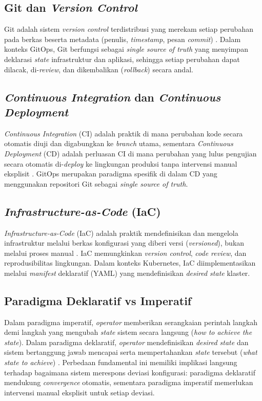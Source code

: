 \subsection{Git dan \textit{Version Control}}
Git adalah sistem \textit{version control} terdistribusi yang merekam setiap perubahan pada berkas beserta metadata (penulis, \textit{timestamp}, pesan \textit{commit}) \citep{chacon2014git}. Dalam konteks GitOps, Git berfungsi sebagai \textit{single source of truth} yang menyimpan deklarasi \textit{state} infrastruktur dan aplikasi, sehingga setiap perubahan dapat dilacak, di-\textit{review}, dan dikembalikan (\textit{rollback}) secara andal.

\subsection{\textit{Continuous Integration} dan \textit{Continuous Deployment}}
\textit{Continuous Integration} (CI) adalah praktik di mana perubahan kode secara otomatis diuji dan digabungkan ke \textit{branch} utama, sementara \textit{Continuous Deployment} (CD) adalah perluasan CI di mana perubahan yang lulus pengujian secara otomatis di-\textit{deploy} ke lingkungan produksi tanpa intervensi manual eksplisit \citep{humble2010continuous, ebert2016devops}. GitOps merupakan paradigma spesifik di dalam CD yang menggunakan repositori Git sebagai \textit{single source of truth}.

\subsection{\textit{Infrastructure-as-Code} (IaC)}
\textit{Infrastructure-as-Code} (IaC) adalah praktik mendefinisikan dan mengelola infrastruktur melalui berkas konfigurasi yang diberi versi (\textit{versioned}), bukan melalui proses manual \citep{morris2020iac}. IaC memungkinkan \textit{version control}, \textit{code review}, dan reprodusibilitas lingkungan. Dalam konteks Kubernetes, IaC diimplementasikan melalui \textit{manifest} deklaratif (YAML) yang mendefinisikan \textit{desired state} klaster.

\subsection{Paradigma Deklaratif vs Imperatif}
Dalam paradigma imperatif, \textit{operator} memberikan serangkaian perintah langkah demi langkah yang mengubah \textit{state} sistem secara langsung (\textit{how to achieve the state}). Dalam paradigma deklaratif, \textit{operator} mendefinisikan \textit{desired state} dan sistem bertanggung jawab mencapai serta mempertahankan \textit{state} tersebut (\textit{what state to achieve}) \citep{scott2015plp}. Perbedaan fundamental ini memiliki implikasi langsung terhadap bagaimana sistem merespons deviasi konfigurasi: paradigma deklaratif mendukung \textit{convergence} otomatis, sementara paradigma imperatif memerlukan intervensi manual eksplisit untuk setiap deviasi.

